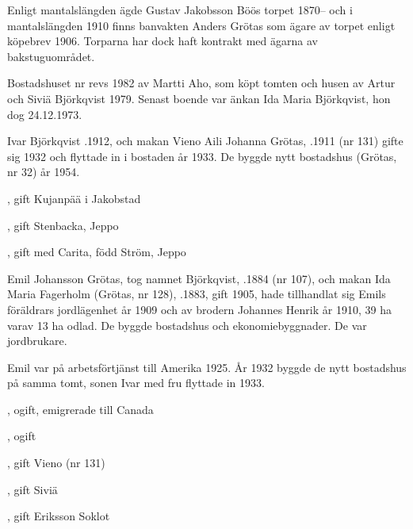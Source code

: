 Enligt  mantalslängden ägde Gustav Jakobsson Böös torpet 1870-- och i mantalslängden 1910 finns banvakten Anders Grötas som ägare av torpet enligt köpebrev 1906. Torparna har dock haft kontrakt med ägarna av bakstuguområdet.






Bostadshuset nr  revs 1982 av Martti Aho, som köpt tomten och husen av Artur och Siviä Björkqvist 1979. Senast boende var änkan Ida Maria Björkqvist, hon dog 24.12.1973.\jhvspace{}


Ivar Björkqvist .1912, och makan Vieno Aili Johanna Grötas, .1911 (nr 131) gifte sig 1932 och flyttade in i bostaden år 1933. De byggde nytt bostadshus (Grötas, nr 32) år 1954.
\begin{jhchildren}
  \item {}, gift Kujanpää i Jakobstad
  \item {}, gift Stenbacka, Jeppo
  \item {}, gift med Carita, född Ström, Jeppo
\end{jhchildren}


Emil Johansson Grötas, tog namnet Björkqvist, .1884 (nr 107), och makan Ida Maria Fagerholm (Grötas, nr 128), .1883, gift 1905, hade tillhandlat sig Emils föräldrars jordlägenhet år 1909 och av brodern Johannes Henrik år 1910, 39 ha varav 13 ha odlad. De byggde bostadshus och ekonomiebyggnader. De var jordbrukare.

Emil var på arbetsförtjänst till Amerika 1925. År 1932 byggde de nytt bostadshus på samma tomt, sonen Ivar med fru flyttade in 1933.
\begin{jhchildren}
  \item {}, ogift, emigrerade till Canada
  \item {}, ogift
  \item {}, gift Vieno (nr 131)
  \item {}, gift Siviä
  \item {}, gift Eriksson Soklot
\end{jhchildren}


